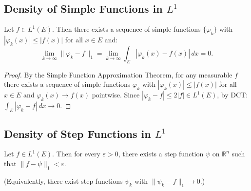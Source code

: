 \documentclass[11pt]{report}
\begin{document}
\subsection{Density of Simple Functions in $L^1$}

\begin{thmbox}
Let $f \in L^1(E)$. Then there exists a sequence of simple functions $\{\varphi_k\}$ with $|\varphi_k(x)| \leq |f(x)|$ for all $x \in E$ and:
\[
\lim_{k \to \infty} \|\varphi_k - f\|_1 = \lim_{k \to \infty} \int_E |\varphi_k(x) - f(x)|\,dx = 0.
\]
\end{thmbox}

\begin{proof}
By the Simple Function Approximation Theorem, for any measurable $f$ there exists a sequence of simple functions $\varphi_k$ with $|\varphi_k(x)| \leq |f(x)|$ for all $x \in E$ and $\varphi_k(x) \to f(x)$ pointwise. Since $|\varphi_k - f| \leq 2|f| \in L^1(E)$, by DCT: $\int_E |\varphi_k - f|\,dx \to 0$.
\end{proof}

\subsection{Density of Step Functions in $L^1$}

\begin{thmbox}
Let $f \in L^1(E)$. Then for every $\varepsilon > 0$, there exists a step function $\psi$ on $\mathbb{R}^n$ such that $\|f - \psi\|_1 < \varepsilon$.

(Equivalently, there exist step functions $\psi_k$ with $\|\psi_k - f\|_1 \to 0$.)
\end{thmbox}
\end{document}
